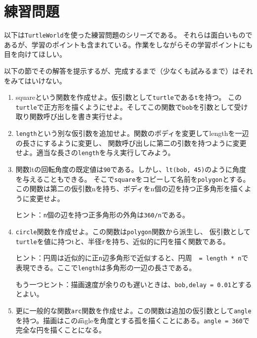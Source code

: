 \documentclass[a4j,12pt,makeidx]{jbook}
\begin{document}
\section{練習問題}
以下は{\tt TurtleWorld}を使った練習問題のシリーズである。
それらは面白いものであるが、学習のポイントも含まれている。作業をしながらその学習ポイントにも目を向けてほしい。\par
以下の節でその解答を提示するが、完成するまで（少なくも試みるまで）はそれをみてはいけない。
\begin{enumerate}
\item squareという関数を作成せよ。仮引数として{\tt turtle}である{\tt t}を持つ。
この{\tt turtle}で正方形を描くようにせよ。そしてこの関数で{\tt bob}を引数として受け取り関数呼び出しを書き実行せよ。

\item {\tt length}という別な仮引数を追加せよ。関数のボディを変更してlengthを一辺の長さにするように変更し、
関数呼び出しに第二の引数を持つように変更せよ。適当な長さの{\tt length}を与え実行してみよう。

\item 関数ltの回転角度の既定値は{\tt 90}である。しかし、{\tt lt(bob, 45)}のように角度を与えることもできる。
そこで{\tt square}をコピーして名前を{\tt polygon}とする。この関数は第二の仮引数nを持ち、ボディをn個の辺を持つ正多角形を描くように変更せよ。\par
ヒント：{\tt n}個の辺を持つ正多角形の外角は{\tt 360/n}である。

\item {\tt circle}関数を作成せよ。この関数は{\tt polygon}関数から派生し、
仮引数として{\tt turtle}を値に持つtと、半径{\tt r}を持ち、近似的に円を描く関数である。\par
ヒント：円周は近似的に正{\tt n}辺多角形で近似すると、円周　{\tt = length * n}で表現できる。ここで{\tt length}は多角形の一辺の長さである。 \par
もう一つヒント：描画速度が余りのも遅いときは、{\tt bob,delay = 0.01}とするとよい。

\item 更に一般的な関数{\tt arc}関数を作成せよ。この関数は追加の仮引数として{\tt angle}を持つ。描画はこの{\t angle}を角度とする孤を描くことにある。{\tt angle = 360}で完全な円を描くことになる。
\end{enumerate}
%
\end{document}
